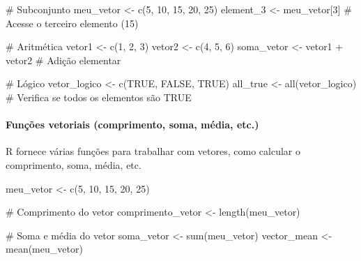 \documentclass[
  letterpaper,
  DIV=11,
  numbers=noendperiod]{scrartcl}
\let\oldparagraph\paragraph
\renewcommand{\paragraph}[1]{\oldparagraph{#1}\mbox{}}
\newenvironment{Shaded}{\begin{snugshade}}{\end{snugshade}}
\newcommand{\CommentTok}[1]{\textcolor[rgb]{0.37,0.37,0.37}{#1}}
\newcommand{\ConstantTok}[1]{\textcolor[rgb]{0.56,0.35,0.01}{#1}}
\newcommand{\DecValTok}[1]{\textcolor[rgb]{0.68,0.00,0.00}{#1}}
\newcommand{\FunctionTok}[1]{\textcolor[rgb]{0.28,0.35,0.67}{#1}}
\newcommand{\NormalTok}[1]{\textcolor[rgb]{0.00,0.23,0.31}{#1}}
\newcommand{\OtherTok}[1]{\textcolor[rgb]{0.00,0.23,0.31}{#1}}
\newcommand{\SpecialCharTok}[1]{\textcolor[rgb]{0.37,0.37,0.37}{#1}}
\begin{document}
\begin{Shaded}
\begin{Highlighting}[]
\CommentTok{\# Subconjunto}
\NormalTok{meu\_vetor }\OtherTok{\textless{}{-}} \FunctionTok{c}\NormalTok{(}\DecValTok{5}\NormalTok{, }\DecValTok{10}\NormalTok{, }\DecValTok{15}\NormalTok{, }\DecValTok{20}\NormalTok{, }\DecValTok{25}\NormalTok{)}
\NormalTok{element\_3 }\OtherTok{\textless{}{-}}\NormalTok{ meu\_vetor[}\DecValTok{3}\NormalTok{] }\CommentTok{\# Acesse o terceiro elemento (15)}

\CommentTok{\# Aritmética}
\NormalTok{vetor1 }\OtherTok{\textless{}{-}} \FunctionTok{c}\NormalTok{(}\DecValTok{1}\NormalTok{, }\DecValTok{2}\NormalTok{, }\DecValTok{3}\NormalTok{)}
\NormalTok{vetor2 }\OtherTok{\textless{}{-}} \FunctionTok{c}\NormalTok{(}\DecValTok{4}\NormalTok{, }\DecValTok{5}\NormalTok{, }\DecValTok{6}\NormalTok{)}
\NormalTok{soma\_vetor }\OtherTok{\textless{}{-}}\NormalTok{ vetor1 }\SpecialCharTok{+}\NormalTok{ vetor2 }\CommentTok{\# Adição elementar}

\CommentTok{\# Lógico}
\NormalTok{vetor\_logico }\OtherTok{\textless{}{-}} \FunctionTok{c}\NormalTok{(}\ConstantTok{TRUE}\NormalTok{, }\ConstantTok{FALSE}\NormalTok{, }\ConstantTok{TRUE}\NormalTok{)}
\NormalTok{all\_true }\OtherTok{\textless{}{-}} \FunctionTok{all}\NormalTok{(vetor\_logico) }\CommentTok{\# Verifica se todos os elementos são TRUE}
\end{Highlighting}
\end{Shaded}

\hypertarget{funuxe7uxf5es-vetoriais-comprimento-soma-muxe9dia-etc.}{%
\paragraph{Funções vetoriais (comprimento, soma, média,
etc.)}\label{funuxe7uxf5es-vetoriais-comprimento-soma-muxe9dia-etc.}}

R fornece várias funções para trabalhar com vetores, como calcular o
comprimento, soma, média, etc.

\begin{Shaded}
\begin{Highlighting}[]
\NormalTok{meu\_vetor }\OtherTok{\textless{}{-}} \FunctionTok{c}\NormalTok{(}\DecValTok{5}\NormalTok{, }\DecValTok{10}\NormalTok{, }\DecValTok{15}\NormalTok{, }\DecValTok{20}\NormalTok{, }\DecValTok{25}\NormalTok{)}

\CommentTok{\# Comprimento do vetor}
\NormalTok{comprimento\_vetor }\OtherTok{\textless{}{-}} \FunctionTok{length}\NormalTok{(meu\_vetor)}

\CommentTok{\# Soma e média do vetor}
\NormalTok{soma\_vetor }\OtherTok{\textless{}{-}} \FunctionTok{sum}\NormalTok{(meu\_vetor)}
\NormalTok{vector\_mean }\OtherTok{\textless{}{-}} \FunctionTok{mean}\NormalTok{(meu\_vetor)}
\end{Highlighting}
\end{Shaded}
\end{document}

